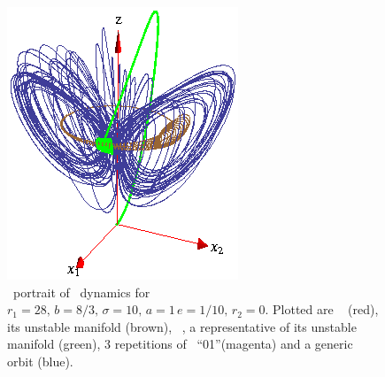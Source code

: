 \begin{figure}[ht]
\begin{center}
  \includegraphics[height=0.25\textheight]{../figs/CLE}
\end{center}
\caption[Complex Lorenz flow phase space]
{ \Statesp\ portrait of \CLe\ dynamics for $r_1=28,\, b=8/3,\,
\sigma=10,\, a=1\, e=1/10,\, r_2=0$. Plotted are \reqv\
 (red), its unstable manifold (brown), \eqv\ , a
representative of its unstable manifold (green), 3 repetitions
of \rpo\ ``01''(magenta) and a generic orbit (blue).}
\label{fig:CLE}
\end{figure}


